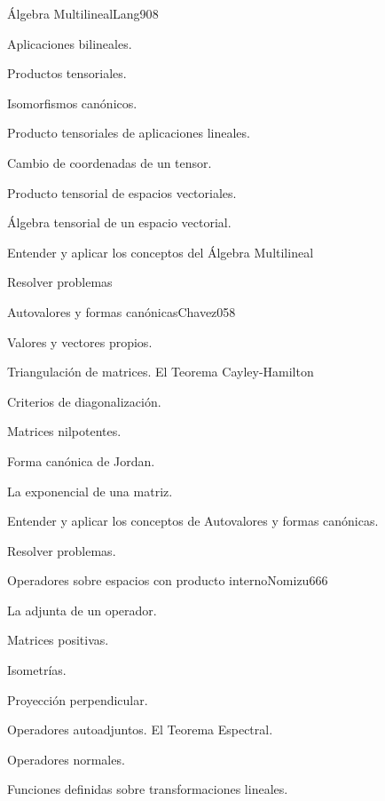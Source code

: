 \begin{syllabus}
\begin{unit}{Álgebra Multilineal}{Lang90}{8}
   \begin{topics}
         \item  Aplicaciones bilineales.
	 \item  Productos tensoriales.
         \item  Isomorfismos canónicos.
	 \item  Producto tensoriales de aplicaciones lineales.
         \item  Cambio de coordenadas de un tensor.
	 \item  Producto tensorial de espacios vectoriales.
         \item  Álgebra tensorial de un espacio vectorial.
   \end{topics}

   \begin{unitgoals}
         \item  Entender y aplicar los conceptos del Álgebra Multilineal
         \item  Resolver problemas
   \end{unitgoals}
\end{unit}

\begin{unit}{Autovalores y formas canónicas}{Chavez05}{8}
   \begin{topics}
	\item  Valores y vectores propios.
	\item  Triangulación de matrices. El Teorema Cayley-Hamilton
	\item  Criterios de diagonalización.
	\item  Matrices nilpotentes.
	\item Forma canónica de Jordan.
	\item La exponencial de una matriz.
   \end{topics}

   \begin{unitgoals}
         \item  Entender y aplicar los conceptos de Autovalores y formas canónicas.
         \item  Resolver problemas.
   \end{unitgoals}
\end{unit}

\begin{unit}{Operadores sobre espacios con producto interno}{Nomizu66}{6}
   \begin{topics}
	\item  La adjunta de un operador.
	\item  Matrices positivas.
	\item  Isometrías.
	\item  Proyección perpendicular.
	\item  Operadores autoadjuntos. El Teorema Espectral.
	\item  Operadores normales.
	\item Funciones definidas sobre transformaciones lineales.
   \end{topics}


\end{unit}
\end{syllabus}
